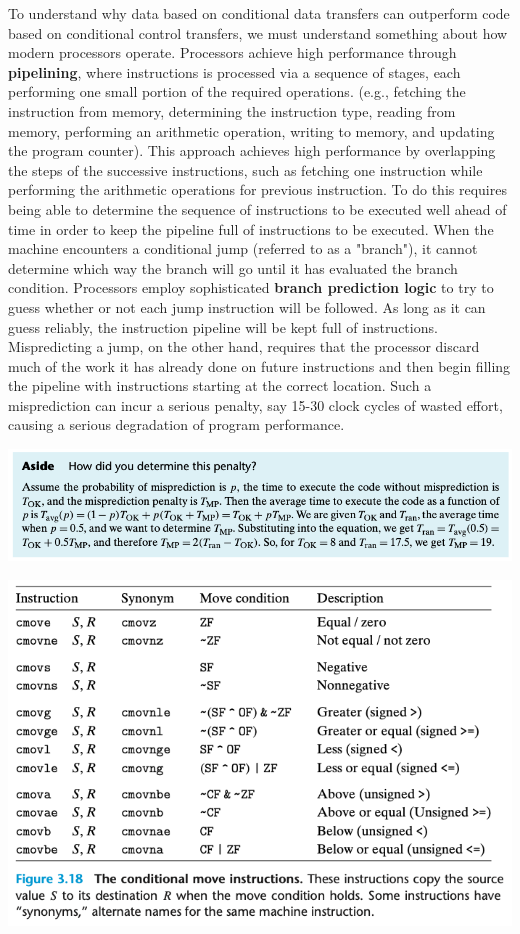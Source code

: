 \documentclass[11pt]{article}
\begin{document}
To understand why data based on conditional data transfers can outperform code based on conditional control transfers, we must understand something about how modern processors operate. Processors achieve high performance through \textbf{pipelining}, where instructions is processed via a sequence of stages, each performing one small portion of the required operations. (e.g., fetching the instruction from memory, determining the instruction type, reading from memory, performing an arithmetic operation, writing to memory, and updating the program counter). This approach achieves high performance by overlapping the steps of the successive instructions, such as fetching one instruction while performing the arithmetic operations for previous instruction. To do this requires being able to determine the sequence of instructions to be executed well ahead of time in order to keep the pipeline full of instructions to be executed. When the machine encounters a conditional jump (referred to as a "branch"), it cannot determine which way the branch will go until it has evaluated the branch condition. Processors employ sophisticated \textbf{branch prediction logic} to try to guess whether or not each jump instruction will be followed. As long as it can guess reliably, the instruction pipeline will be kept full of instructions. Mispredicting a jump, on the other hand, requires that the processor discard much of the work it has already done on future instructions and then begin filling the pipeline with instructions starting at the correct location. Such a misprediction can incur a serious penalty, say 15-30 clock cycles of wasted effort, causing a serious degradation of program performance.\\


\begin{center}
\includegraphics[width=.9\linewidth]{pics/determine-penalty.png}
\end{center}


\begin{center}
\includegraphics[width=.9\linewidth]{pics/the-conditional-move-instructions.png}
\end{center}
\end{document}
